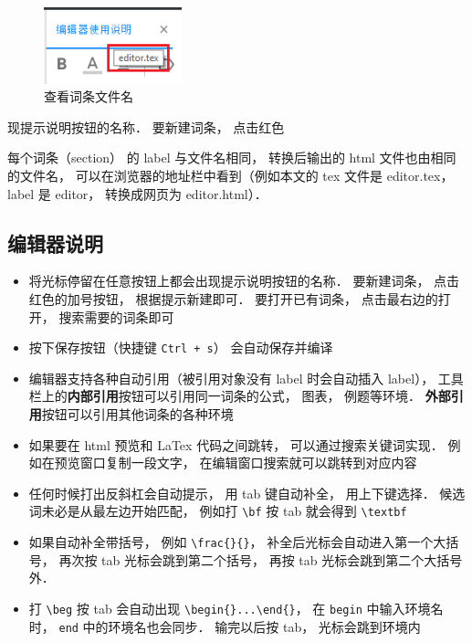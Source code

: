 \begin{figure}[ht]
\centering
\includegraphics[width=4cm]{./figures/editor2.png}
\caption{查看词条文件名} \label{editor_fig2}
\end{figure}现提示说明按钮的名称． 要新建词条， 点击红色

每个词条（section） 的 label 与文件名相同， 转换后输出的 html 文件也由相同的文件名， 可以在浏览器的地址栏中看到（例如本文的 tex 文件是 editor.tex， label 是 editor， 转换成网页为 editor.html）．

\subsection{编辑器说明}
\begin{itemize}
\item 将光标停留在任意按钮上都会出现提示说明按钮的名称． 要新建词条， 点击红色的加号按钮， 根据提示新建即可． 要打开已有词条， 点击最右边的打开， 搜索需要的词条即可

\item 按下保存按钮（快捷键 \lstinline|Ctrl + s|） 会自动保存并编译

\item 编辑器支持各种自动引用（被引用对象没有 label 时会自动插入 label）， 工具栏上的\textbf{内部引用}按钮可以引用同一词条的公式， 图表， 例题等环境． \textbf{外部引用}按钮可以引用其他词条的各种环境

\item 如果要在 html 预览和 LaTex 代码之间跳转， 可以通过搜索关键词实现． 例如在预览窗口复制一段文字， 在编辑窗口搜索就可以跳转到对应内容

\item 任何时候打出反斜杠会自动提示， 用 tab 键自动补全， 用上下键选择． 候选词未必是从最左边开始匹配， 例如打 \lstinline|\bf| 按 tab 就会得到 \lstinline|\textbf|

\item 如果自动补全带括号， 例如 \lstinline|\frac{}{}|， 补全后光标会自动进入第一个大括号， 再次按 tab 光标会跳到第二个括号， 再按 tab 光标会跳到第二个大括号外．

\item 打 \lstinline|\beg| 按 tab 会自动出现 \lstinline|\begin{}...\end{}|， 在 \lstinline|begin| 中输入环境名时， \lstinline|end| 中的环境名也会同步． 输完以后按 tab， 光标会跳到环境内
\end{itemize}

